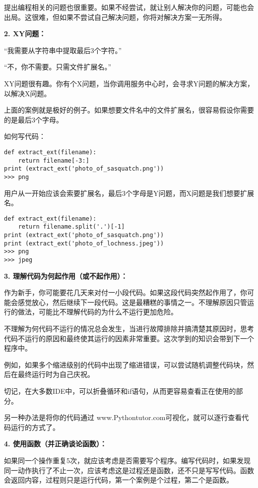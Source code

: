 \documentclass[]{ctexbook}
\begin{document}
提出编程相关的问题也很重要。如果不经尝试，就让别人解决你的问题，可能也会出局。这很难，但如果不尝试自己解决问题，你将对解决方案一无所得。

\textbf{2. XY问题：}

``我需要从字符串中提取最后3个字符。''

``不，你不需要。只需文件扩展名。''

XY问题很有趣。你有个X问题，当你调用服务中心时，会寻求Y问题的解决方案，以解决X问题。

上面的案例就是极好的例子。如果想要文件名中的文件扩展名，很容易假设你需要的是最后3个字母。

如何写代码：

\begin{verbatim}
def extract_ext(filename):
    return filename[-3:]
print (extract_ext('photo_of_sasquatch.png'))
>>> png
\end{verbatim}

用户从一开始应该会索要扩展名，最后3个字母是Y问题，而X问题是我们想要扩展名。

\begin{verbatim}
def extract_ext(filename):
    return filename.split('.')[-1]
print (extract_ext('photo_of_sasquatch.png'))
print (extract_ext('photo_of_lochness.jpeg'))
>>> png
>>> jpeg
\end{verbatim}

\textbf{3. 理解代码为何起作用（或不起作用）：}

作为新手，你可能要花几天来对付一小段代码。如果这段代码突然起作用了，你可能会感觉放心，然后继续下一段代码。这是最糟糕的事情之一。不理解原因只管运行的做法，可能比不理解代码的为什么不运行更加危险。

不理解为何代码不运行的情况总会发生，当进行故障排除并搞清楚其原因时，思考代码不运行的原因和最终使其运行的因素非常重要。这次学到的知识会带到下一个程序中。

例如，如果多个缩进级别的代码中出现了缩进错误，可以尝试随机调整代码块，然后在最终运行时为自己庆祝。

切记，在大多数IDE中，可以折叠循环和if语句，从而更容易查看正在使用的部分。

另一种办法是将你的代码通过 www.Pythontutor.com可视化，就可以逐行查看代码运行的方式了。

\textbf{4. 使用函数（并正确谈论函数）：}

如果同一个操作重复5次，就应该考虑是否需要写个程序。编写代码时，如果发现同一动作执行了不止一次，应该考虑这是过程还是函数，还不只是写写代码。函数会返回内容，过程则只是运行代码，第一个案例是个过程，第二个是函数。
\end{document}
